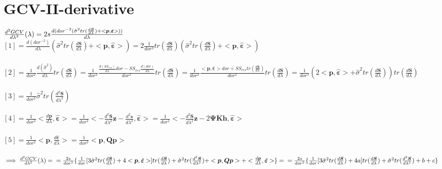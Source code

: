 \documentclass[11pt,twoside]{report}
\begin{document}
\section{GCV-II-derivative}
$ \frac{d^2GCV}{d\lambda^2}(\lambda) = 2s\frac{d({dor}^{-2}(\hat{\sigma}^2tr(\frac{d\mathbold{S}}{d\lambda}) + <\mathbold{p}, \hat{\mathbold{\varepsilon}}>))}{d\lambda}\\$
\\
$ [1] = \frac{d(dor^{-2})}{d\lambda}(\hat{\sigma}^2tr(\frac{d\mathbold{S}}{d\lambda}) + <\boldsymbol{p}, \hat{\mathbold{\varepsilon}}>) =  2\frac{1}{dor^3}tr(\frac{d\mathbold{S}}{d\lambda})(\hat{\sigma}^2tr(\frac{d\mathbold{S}}{d\lambda}) + <\boldsymbol{p}, \hat{\mathbold{\varepsilon}}>)$\\
\\
$ [2] = \frac{1}{dor^2}\frac{d(\hat{\sigma}^2)}{d\lambda}tr(\frac{d\mathbold{S}}{d\lambda}) = \frac{1}{dor^2}\frac{\frac{d(SS_{res})}{d\lambda}dor - SS_{res}\frac{d(dor)}{d\lambda}}{dor^2}tr(\frac{d\mathbold{S}}{d\lambda}) = \frac{1}{dor^2}\frac{<\mathbold{p}, \hat{\mathbold{\varepsilon}}>dor + SS_{res}tr(\frac{d\mathbold{S}}{d\lambda})}{dor^2}tr(\frac{d\mathbold{S}}{d\lambda}) = \frac{1}{dor^3}(2<\mathbold{p}, \hat{\mathbold{\varepsilon}}> + \hat{\sigma}^2tr(\frac{d\mathbold{S}}{d\lambda}))tr(\frac{d\mathbold{S}}{d\lambda})$\\
\\
$ [3] =  \frac{1}{dor^2}\hat{\sigma}^2tr(\frac{d^2\mathbold{S}}{d\lambda^2})$\\
\\
$ [4] = \frac{1}{dor^2}<\frac{d\mathbold{p}}{d\lambda}, \hat{\mathbold{\varepsilon}}> =  \frac{1}{dor^2}<-\frac{d^2\mathbold{S}}{d\lambda^2}\mathbold{z} -\frac{d^2\mathbold{s}}{d\lambda^2}, \hat{\mathbold{\varepsilon}}> =  \frac{1}{dor^2}<-\frac{d^2\mathbold{S}}{d\lambda^2}\mathbold{z}  -2\boldsymbol{\Psi} \textbf{K} \textbf{h}, \hat{\mathbold{\varepsilon}}> $\\
\\
$ [5] =  \frac{1}{dor^2}<\mathbold{p}, \frac{d\hat{\mathbold{\varepsilon}}}{d\lambda}> = \frac{1}{dor^2}<\mathbold{p},\mathbold{Q}\mathbold{p}>$\\
\\
$\implies  \frac{d^2GCV}{d\lambda^2}(\lambda) =
\\ =\frac{2s}{dor^2}\{\frac{1}{dor}[3\hat{\sigma}^2tr(\frac{d\mathbold{S}}{d\lambda}) + 4<\mathbold{p}, \hat{\mathbold{\varepsilon}}>]tr(\frac{d\mathbold{S}}{d\lambda}) + \hat{\sigma}^2tr(\frac{d^2\mathbold{S}}{d\lambda^2}) + <\mathbold{p},\mathbold{Q} \mathbold{p}> + <\frac{d\mathbold{p}}{d\lambda}, \hat{\mathbold{\varepsilon}}>\} = \\
=\frac{2s}{dor^2}\{\frac{1}{dor}[3\hat{\sigma}^2tr(\frac{d\mathbold{S}}{d\lambda}) + 4a]tr(\frac{d\mathbold{S}}{d\lambda}) + \hat{\sigma}^2tr(\frac{d^2\mathbold{S}}{d\lambda^2}) +b+c\}$
\end{document}
